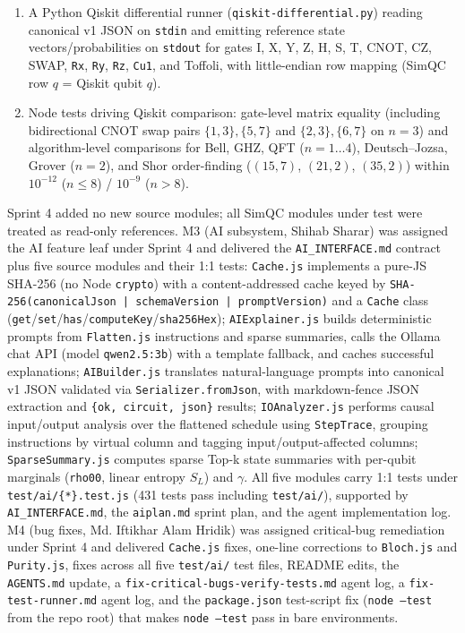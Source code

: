 \documentclass[conference]{IEEEtran}
\begin{document}
\begin{enumerate}
    \item A Python Qiskit differential runner (\texttt{qiskit-differential.py}) reading canonical v1 JSON on \texttt{stdin} and emitting reference state vectors/probabilities on \texttt{stdout} for gates I, X, Y, Z, H, S, T, CNOT, CZ, SWAP, \texttt{Rx}, \texttt{Ry}, \texttt{Rz}, \texttt{Cu1}, and Toffoli, with little-endian row mapping (SimQC row $q$ = Qiskit qubit $q$).

    \item Node tests driving Qiskit comparison: gate-level matrix equality (including bidirectional CNOT swap pairs $\{1,3\},\{5,7\}$ and $\{2,3\},\{6,7\}$ on $n=3$) and algorithm-level comparisons for Bell, GHZ, QFT ($n=1\ldots4$), Deutsch--Jozsa, Grover ($n=2$), and Shor order-finding ($(15,7)$, $(21,2)$, $(35,2)$) within $10^{-12}$ ($n\le8$) / $10^{-9}$ ($n>8$).
\end{enumerate}

Sprint 4 added no new source modules; all SimQC modules under test were treated as read-only references. M3 (AI subsystem, Shihab Sharar) was assigned the AI feature leaf under Sprint 4 and delivered the \texttt{AI\_INTERFACE.md} contract plus five source modules and their 1:1 tests: \texttt{Cache.js} implements a pure-JS SHA-256 (no Node \texttt{crypto}) with a content-addressed cache keyed by \texttt{SHA-256(canonicalJson | schemaVersion | promptVersion)} and a \texttt{Cache} class (\texttt{get}/\texttt{set}/\texttt{has}/\texttt{computeKey}/\texttt{sha256Hex}); \texttt{AIExplainer.js} builds deterministic prompts from \texttt{Flatten.js} instructions and sparse summaries, calls the Ollama chat API (model \texttt{qwen2.5:3b}) with a template fallback, and caches successful explanations; \texttt{AIBuilder.js} translates natural-language prompts into canonical v1 JSON validated via \texttt{Serializer.fromJson}, with markdown-fence JSON extraction and \texttt{\{ok, circuit, json\}} results; \texttt{IOAnalyzer.js} performs causal input/output analysis over the flattened schedule using \texttt{StepTrace}, grouping instructions by virtual column and tagging input/output-affected columns; \texttt{SparseSummary.js} computes sparse Top-k state summaries with per-qubit marginals (\texttt{rho00}, linear entropy $S_L$) and $\gamma$. All five modules carry 1:1 tests under \texttt{test/ai/\{*\}.test.js} (431 tests pass including \texttt{test/ai/}), supported by \texttt{AI\_INTERFACE.md}, the \texttt{aiplan.md} sprint plan, and the agent implementation log. M4 (bug fixes, Md. Iftikhar Alam Hridik) was assigned critical-bug remediation under Sprint 4 and delivered \texttt{Cache.js} fixes, one-line corrections to \texttt{Bloch.js} and \texttt{Purity.js}, fixes across all five \texttt{test/ai/} test files, README edits, the \texttt{AGENTS.md} update, a \texttt{fix-critical-bugs-verify-tests.md} agent log, a \texttt{fix-test-runner.md} agent log, and the \texttt{package.json} test-script fix (\texttt{node --test} from the repo root) that makes \texttt{node --test} pass in bare environments.
\end{document}

